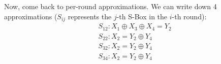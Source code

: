 \documentclass[9pt]{beamer}
\begin{document}
\begin{frame}

\begin{columns}
\begin{column}{0.6\textwidth}
Now, come back to per-round approximations. We can write down 4 approximations ($S_{ij}$ represents the $j$-th S-Box in the $i$-th round):
\begin{align*}
& S_{12}: X_1 \oplus X_3 \oplus X_4 = Y_2 \\
& S_{22}: X_2 = Y_2 \oplus Y_4 \\
& S_{32}: X_2 = Y_2 \oplus Y_4 \\
& S_{34}: X_2 = Y_2 \oplus Y_4 \\
\end{align*}
\end{column}


\end{columns}
\end{frame}
\end{document}
